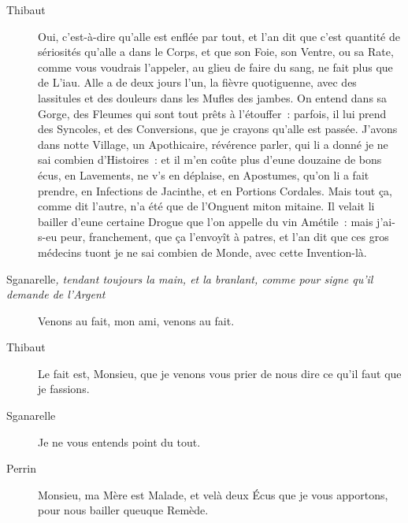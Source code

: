\documentclass[french,twoside]{book} %
\begin{document}
 \begin{description} \item[Thibaut] 

Oui, c’est-à-dire qu’alle est enflée par tout, et l’an dit que c’est quantité de sériosités qu’alle a dans le Corps, et que son Foie, son Ventre, ou sa Rate, comme vous voudrais l’appeler, au glieu de faire du sang, ne fait plus que de L’iau. Alle a de deux jours l’un, la fièvre quotiguenne, avec des lassitules et des douleurs dans les Mufles des jambes. On entend dans sa Gorge, des Fleumes qui sont tout prêts à l’étouffer : parfois, il lui prend des Syncoles, et des Conversions, que je crayons qu’alle est passée. J’avons dans notte Village, un Apothicaire, révérence parler, qui li a donné je ne sai combien d’Histoires : et il m’en coûte plus d’eune douzaine de bons écus, en Lavements, ne v’s en déplaise, en Apostumes, qu’on li a fait prendre, en Infections de Jacinthe, et en Portions Cordales. Mais tout ça, comme dit l’autre, n’a été que de l’Onguent miton mitaine. Il velait li bailler d’eune certaine Drogue que l’on appelle du vin Amétile : mais j’ai-s-eu peur, franchement, que ça l’envoyît à patres, et l’an dit que ces gros médecins tuont je ne sai combien de Monde, avec cette Invention-là.\end{description}
 \begin{description} \item[Sganarelle\textit{, tendant toujours la main, et la branlant, comme pour signe qu’il demande de l’Argent}\par
] 

Venons au fait, mon ami, venons au fait.\end{description}
 \begin{description} \item[Thibaut] 

Le fait est, Monsieu, que je venons vous prier de nous dire ce qu’il faut que je fassions.\end{description}
 \begin{description} \item[Sganarelle] 

Je ne vous entends point du tout.\end{description}
 \begin{description} \item[Perrin] 

Monsieu, ma Mère est Malade, et velà deux Écus que je vous apportons, pour nous bailler queuque Remède.\end{description}
\end{document}
